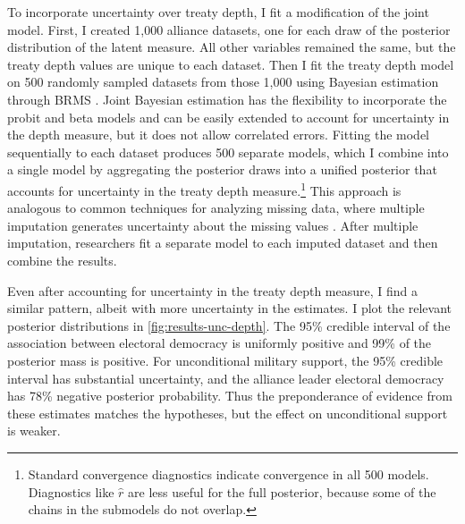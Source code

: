 \documentclass[12pt]{article}
\begin{document}
To incorporate uncertainty over treaty depth, I fit a modification of the joint model. 
First, I created 1,000 alliance datasets, one for each draw of the posterior distribution of the latent measure.
All other variables remained the same, but the treaty depth values are unique to each dataset. 
Then I fit the treaty depth model on 500 randomly sampled datasets from those 1,000 using Bayesian estimation through BRMS \citep{Buerkner2017}. 
Joint Bayesian estimation has the flexibility to incorporate the probit and beta models and can be easily extended to account for uncertainty in the depth measure, but it does not allow correlated errors. 
Fitting the model sequentially to each dataset produces 500 separate models, which I combine into a single model by aggregating the posterior draws into a unified posterior that accounts for uncertainty in the treaty depth measure.\footnote{Standard convergence diagnostics indicate convergence in all 500 models. Diagnostics like $\hat{r}$ are less useful for the full posterior, because some of the chains in the submodels do not overlap.}
This approach is analogous to common techniques for analyzing missing data, where multiple imputation generates uncertainty about the missing values \citep{Hollenbachetal2018imp}.
After multiple imputation, researchers fit a separate model to each imputed dataset and then combine the results. 


Even after accounting for uncertainty in the treaty depth measure, I find a similar pattern, albeit with more uncertainty in the estimates. 
I plot the relevant posterior distributions in \autoref{fig:results-unc-depth}. 
The 95\% credible interval of the association between electoral democracy is uniformly positive and 99\% of the posterior mass is positive. 
For unconditional military support, the 95\% credible interval has substantial uncertainty, and the alliance leader electoral democracy has 78\% negative posterior probability. 
Thus the preponderance of evidence from these estimates matches the hypotheses, but the effect on unconditional support is weaker. 
\end{document}
